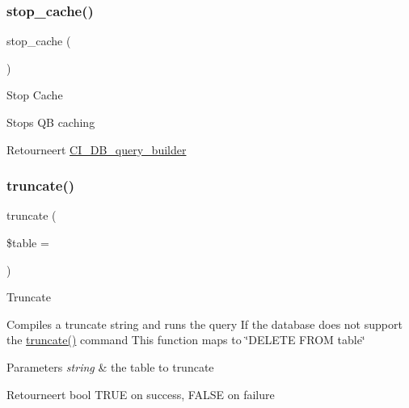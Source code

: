 \subsubsection{\texorpdfstring{stop\_cache()}{stop\_cache()}}
{\footnotesize\ttfamily stop\+\_\+cache (\begin{DoxyParamCaption}{ }\end{DoxyParamCaption})}

Stop Cache

Stops QB caching

\begin{DoxyReturn}{Retourneert}
\mbox{\hyperlink{class_c_i___d_b__query__builder}{C\+I\+\_\+\+D\+B\+\_\+query\+\_\+builder}} 
\end{DoxyReturn}
\mbox{\label{class_c_i___d_b__query__builder_acaa636a6a61d4362c5a32941fc9932ba}} 
\subsubsection{\texorpdfstring{truncate()}{truncate()}}
{\footnotesize\ttfamily truncate (\begin{DoxyParamCaption}\item[{}]{\$table = {\ttfamily \textquotesingle{}\textquotesingle{}} }\end{DoxyParamCaption})}

Truncate

Compiles a truncate string and runs the query If the database does not support the \mbox{\hyperlink{class_c_i___d_b__query__builder_acaa636a6a61d4362c5a32941fc9932ba}{truncate()}} command This function maps to \char`\"{}\+D\+E\+L\+E\+T\+E F\+R\+O\+M table\char`\"{}


\begin{DoxyParams}{Parameters}
{\em string} & the table to truncate \\
\hline
\end{DoxyParams}
\begin{DoxyReturn}{Retourneert}
bool T\+R\+UE on success, F\+A\+L\+SE on failure 
\end{DoxyReturn}
\mbox{\label{class_c_i___d_b__query__builder_a130a26da2dd4e4582ee18f42d71fe6e4}} 
